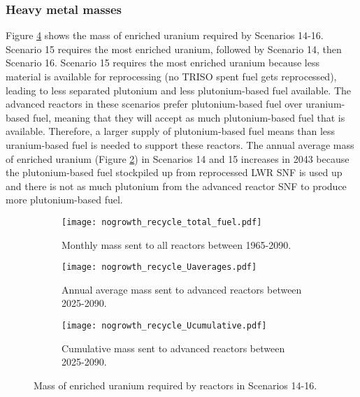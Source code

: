 \subsubsection{Heavy metal masses}
Figure \ref{fig:nogrowth_recycle_uranium} shows 
the mass of enriched uranium required by Scenarios 14-16. 
Scenario 15 requires the most enriched uranium, followed by 
Scenario 14, then Scenario 16. Scenario 15 requires the most enriched 
uranium because less material is available for reprocessing (no 
\gls{TRISO} spent fuel gets reprocessed), leading to 
less separated plutonium and less plutonium-based fuel available. The 
advanced reactors 
in these scenarios prefer plutonium-based fuel over uranium-based fuel, 
meaning that they will accept as much plutonium-based fuel that 
is available. 
Therefore, a larger supply of plutonium-based fuel means than less 
uranium-based fuel is needed to support these reactors.
The annual average mass of enriched uranium (Figure 
\ref{fig:nogrowth_recycle_AR_uranium}) in Scenarios 14 and 15 increases 
in 2043 because the plutonium-based fuel stockpiled up from 
reprocessed \gls{LWR} \gls{SNF} is used up and there is not as much 
plutonium from the advanced reactor \gls{SNF} to produce more 
plutonium-based fuel. 

\begin{figure}[h!]
    \centering
    \begin{subfigure}[b]{0.45\textwidth}
        \centering
        \texttt{[image: nogrowth\_recycle\_total\_fuel.pdf]}
        \caption{Monthly mass sent to all reactors 
        between 1965-2090.}
        \label{fig:nogrowth_recycle_all_uranium}
    \end{subfigure}
    \hfill
    \begin{subfigure}[b]{0.45\textwidth}
        \centering
        \texttt{[image: nogrowth\_recycle\_Uaverages.pdf]}
        \caption{Annual average mass sent to 
        advanced reactors between 2025-2090.}
        \label{fig:nogrowth_recycle_AR_uranium}
    \end{subfigure}
    \begin{subfigure}[b]{0.45\textwidth}
        \centering
        \texttt{[image: nogrowth\_recycle\_Ucumulative.pdf]}
        \caption{Cumulative mass sent to advanced reactors between 2025-2090.}
        \label{fig:nogrowth_recycle_uranium_cumulative}
    \end{subfigure}
       \caption{Mass of enriched uranium required by reactors
        in Scenarios 14-16.}
       \label{fig:nogrowth_recycle_uranium}
\end{figure}

